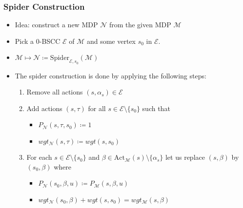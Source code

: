 \documentclass[onlymath]{beamer}
\begin{document}
\begin{frame}
	\frametitle{Spider Construction}
	\begin{itemize}
		\item Idea: construct a new MDP $\mathcal{N}$ from the given MDP $\mathcal{M}$ \pause
		\item Pick a 0-BSCC $\mathcal{E}$ of $\mathcal{M}$ and some vertex $s_0$ in $\mathcal{E}$. \pause
		\item $\mathcal{M} \mapsto \mathcal{N} \coloneqq \mathrm{Spider}_{\mathcal{E}, s_0}(\mathcal{M})$ \pause
		\item The spider construction is done by applying the following steps:
		\begin{enumerate}
			\item Remove all actions $(s, \alpha_s) \in \mathcal{E}$ \pause
			\item Add actions $(s, \tau)$ for all $s\in \mathcal{E} \setminus \{s_0\}$ such that
			\begin{itemize}
				\item $P_{\mathcal{N}}(s,\tau,s_0) \coloneqq 1$ \pause
				\item $wgt_{\mathcal{N}}(s,\tau) \coloneqq wgt (s, s_0)$ \pause
			\end{itemize}
			\item For each $s\in \mathcal{E}\setminus\{s_0\}$ and $\beta \in \mathrm{Act}_{\mathcal{M}}(s)\setminus\{\alpha_s\}$ let us replace $(s,\beta)$ by $(s_0,\beta)$ where
			\begin{itemize}
				\item $P_{\mathcal{N}}(s_0,\beta,u) \coloneqq P_{\mathcal{M}}(s,\beta,u)$
				\item $wgt_{\mathcal{N}}(s_0,\beta) + wgt (s, s_0) = wgt_{\mathcal{M}}(s,\beta)$
			\end{itemize}
		\end{enumerate}
	\end{itemize}

\end{frame}
\end{document}
